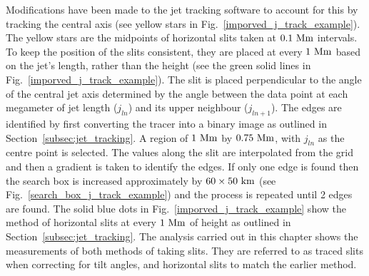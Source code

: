 Modifications have been made to the jet tracking software to account for this by tracking the central axis (see yellow stars in Fig.~\ref{imporved_j_track_example}). The yellow stars are the midpoints of horizontal slits taken at $0.1~\rm{Mm}$ intervals. To keep the position of the slits consistent, they are placed at every $1~\rm{Mm}$ based on the jet's length, rather than the height (see the green solid lines in Fig.~\ref{imporved_j_track_example}). The slit is placed perpendicular to the angle of the central jet axis determined by the angle between the data point at each megameter of jet length ($j_{ln}$) and its upper neighbour ($j_{ln+1}$). The edges are identified by first converting the tracer into a binary image as outlined in Section~\ref{subsec:jet_tracking}. A region of $1~\rm{Mm}$ by $0.75~\rm{Mm}$, with $j_{ln}$ as the centre point is selected. The values along the slit are interpolated from the grid and then a gradient is taken to identify the edges. If only one edge is found then the search box is increased approximately by $60\times 50~\rm{km}$ (see Fig.~\ref{search_box_j_track_example}) and the process is repeated until 2 edges are found. The solid blue dots in  Fig.~\ref{imporved_j_track_example} show the method of horizontal slits at every $1~\rm{Mm}$ of height as outlined in Section~\ref{subsec:jet_tracking}. The analysis carried out in this chapter shows the measurements of both methods of taking slits. They are referred to as traced slits when correcting for tilt angles, and horizontal slits to match the earlier method.
